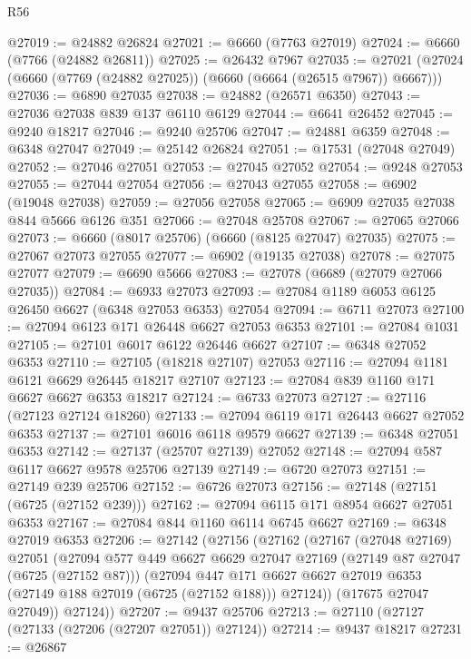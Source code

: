 \begin{lexlean}{R56}
\begin{coremodule}
@27019 := @24882 @26824
@27021 := @6660 (@7763 @27019)
@27024 := @6660 (@7766 (@24882 @26811))
@27025 := @26432 @7967
@27035 := @27021 (@27024 (@6660 (@7769 (@24882 @27025)) (@6660 (@6664 (@26515 @7967)) @6667)))
@27036 := @6890 @27035
@27038 := @24882 (@26571 @6350)
@27043 := @27036 @27038 @839 @137 @6110 @6129
@27044 := @6641 @26452
@27045 := @9240 @18217
@27046 := @9240 @25706
@27047 := @24881 @6359
@27048 := @6348 @27047
@27049 := @25142 @26824
@27051 := @17531 (@27048 @27049)
@27052 := @27046 @27051
@27053 := @27045 @27052
@27054 := @9248 @27053
@27055 := @27044 @27054
@27056 := @27043 @27055
@27058 := @6902 (@19048 @27038)
@27059 := @27056 @27058
@27065 := @6909 @27035 @27038 @844 @5666 @6126 @351
@27066 := @27048 @25708
@27067 := @27065 @27066
@27073 := @6660 (@8017 @25706) (@6660 (@8125 @27047) @27035)
@27075 := @27067 @27073 @27055
@27077 := @6902 (@19135 @27038)
@27078 := @27075 @27077
@27079 := @6690 @5666
@27083 := @27078 (@6689 (@27079 @27066 @27035))
@27084 := @6933 @27073
@27093 := @27084 @1189 @6053 @6125 @26450 @6627 (@6348 @27053 @6353) @27054
@27094 := @6711 @27073
@27100 := @27094 @6123 @171 @26448 @6627 @27053 @6353
@27101 := @27084 @1031
@27105 := @27101 @6017 @6122 @26446 @6627
@27107 := @6348 @27052 @6353
@27110 := @27105 (@18218 @27107) @27053
@27116 := @27094 @1181 @6121 @6629 @26445 @18217 @27107
@27123 := @27084 @839 @1160 @171 @6627 @6627 @6353 @18217
@27124 := @6733 @27073
@27127 := @27116 (@27123 @27124 @18260)
@27133 := @27094 @6119 @171 @26443 @6627 @27052 @6353
@27137 := @27101 @6016 @6118 @9579 @6627
@27139 := @6348 @27051 @6353
@27142 := @27137 (@25707 @27139) @27052
@27148 := @27094 @587 @6117 @6627 @9578 @25706 @27139
@27149 := @6720 @27073
@27151 := @27149 @239 @25706
@27152 := @6726 @27073
@27156 := @27148 (@27151 (@6725 (@27152 @239)))
@27162 := @27094 @6115 @171 @8954 @6627 @27051 @6353
@27167 := @27084 @844 @1160 @6114 @6745 @6627
@27169 := @6348 @27019 @6353
@27206 := @27142
    (@27156
      (@27162
        (@27167
          (@27048 @27169)
          @27051
          (@27094
            @577
            @449
            @6627
            @6629
            @27047
            @27169
            (@27149 @87 @27047 (@6725 (@27152 @87)))
            (@27094
              @447
              @171
              @6627
              @6627
              @27019
              @6353
              (@27149 @188 @27019 (@6725 (@27152 @188)))
              @27124))
          (@17675 @27047 @27049))
        @27124))
@27207 := @9437 @25706
@27213 := @27110 (@27127 (@27133 (@27206 (@27207 @27051)) @27124))
@27214 := @9437 @18217
@27231 := @26867

\end{coremodule}
\end{lexlean}
